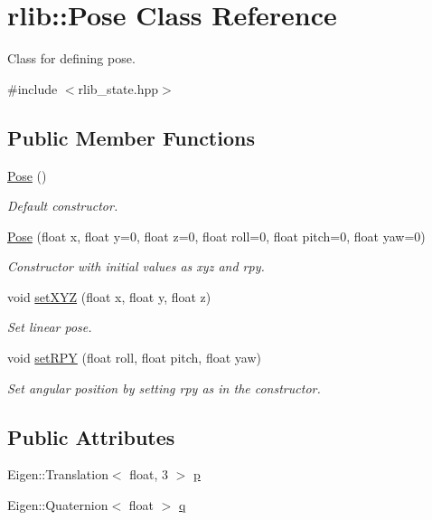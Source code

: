 \hypertarget{classrlib_1_1Pose}{\section{rlib\-:\-:Pose Class Reference}
\label{classrlib_1_1Pose}
}


Class for defining pose.  




{\ttfamily \#include $<$rlib\-\_\-state.\-hpp$>$}

\subsection*{Public Member Functions}
\begin{DoxyCompactItemize}
\item 
\hypertarget{classrlib_1_1Pose_a0c47aadc845fe51dc9c8657920231c44}{\hyperlink{classrlib_1_1Pose_a0c47aadc845fe51dc9c8657920231c44}{Pose} ()}\label{classrlib_1_1Pose_a0c47aadc845fe51dc9c8657920231c44}

\begin{DoxyCompactList}\small\item\em Default constructor. \end{DoxyCompactList}\item 
\hyperlink{classrlib_1_1Pose_a89018f33db4278d47440d42d515ffccb}{Pose} (float x, float y=0, float z=0, float roll=0, float pitch=0, float yaw=0)
\begin{DoxyCompactList}\small\item\em Constructor with initial values as xyz and rpy. \end{DoxyCompactList}\item 
void \hyperlink{classrlib_1_1Pose_a5b2693a81537396e831788fb4597c908}{set\-X\-Y\-Z} (float x, float y, float z)
\begin{DoxyCompactList}\small\item\em Set linear pose. \end{DoxyCompactList}\item 
void \hyperlink{classrlib_1_1Pose_a4342dd9f96dc8efe40fca92f8a6b31be}{set\-R\-P\-Y} (float roll, float pitch, float yaw)
\begin{DoxyCompactList}\small\item\em Set angular position by setting rpy as in the constructor. \end{DoxyCompactList}\end{DoxyCompactItemize}
\subsection*{Public Attributes}
\begin{DoxyCompactItemize}
\item 
Eigen\-::\-Translation$<$ float, 3 $>$ \hyperlink{classrlib_1_1Pose_a79943a3bc939401f14ab8feadc6f9fb0}{p}
\item 
Eigen\-::\-Quaternion$<$ float $>$ \hyperlink{classrlib_1_1Pose_ac598a727181b9ffbe5ac865239390437}{q}
\end{DoxyCompactItemize}


